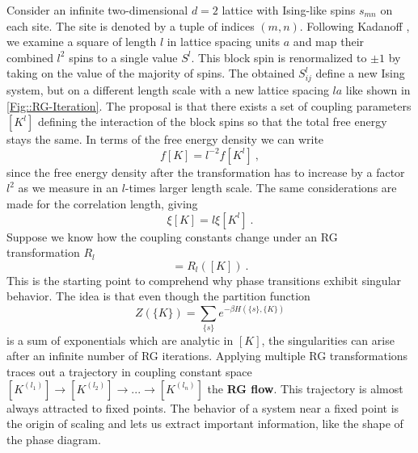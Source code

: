 	Consider an infinite two-dimensional $d=2$ lattice with Ising-like spins $s_{mn}$ on each site. The site is denoted by a tuple of indices $(m,n)$. Following Kadanoff \cite{kadanoff1966scaling}, we examine a square of length $l$ in lattice spacing units $a$ and map  their combined $l^2$ spins to a single value $S^l$. This block spin is renormalized to $\pm 1$ by taking on the value of the majority of spins. The obtained $S_{ij}^l$ define a new Ising system, but on a different length scale with a new lattice spacing $la$ like shown in \autoref{Fig::RG-Iteration}. The proposal is that there exists a set of coupling parameters $[K^l]$ defining the interaction of the block spins so that the total free energy stays the same. In terms of the free energy density we can write
	\begin{equation} \label{free-energy-density}
		f[K] =	l^{-2} f[K^l]~,
	\end{equation}
	since the free energy density after the transformation has to increase by a factor $l^2$ as we measure in an $l$-times larger length scale. The same considerations are made for the correlation length, giving
	\begin{equation}
		\xi[K] = l \xi[K^l]~.
	\end{equation}
	Suppose we know how the coupling constants change under an RG transformation $R_l$
	\begin{equation}
		[K^l] =	R_l([K])~.
	\end{equation}
	This is the starting point to comprehend why phase transitions exhibit singular behavior. The idea is that even though the partition function
	\begin{equation}
		Z(\{K\})	= \sum_{\{s\}} e^{- \beta H(\{s\}, \{K\})}
	\end{equation}
	is a sum of exponentials which are analytic in $[K]$, the singularities can arise after an infinite number of RG iterations. Applying multiple RG transformations traces out a trajectory in coupling constant space $[K^{(l_1)}] \rightarrow [K^{(l_2)}]  \rightarrow ... \rightarrow [K^{(l_n)}]$ the \textbf{RG flow}. This trajectory is almost always attracted to fixed points. The behavior of a system near a fixed point is the origin of scaling and lets us extract important information, like the shape of the phase diagram.
	
